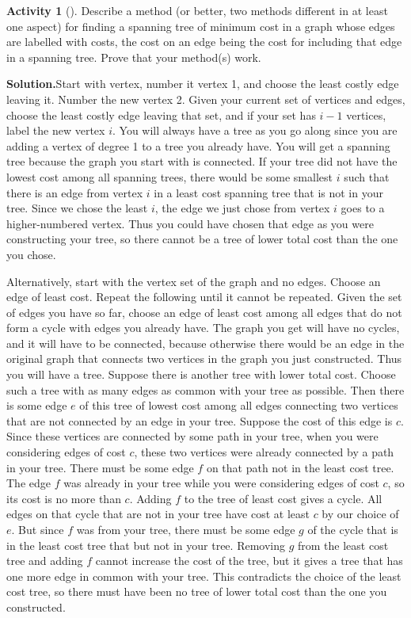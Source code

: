 \documentclass[10pt,]{book}
\theoremstyle{plain}
\theoremstyle{definition}
\newtheorem{activity}[project]{Activity}
\numberwithin{equation}{chapter}
\begin{document}
\begin{activity}[]\label{mincostspantree}
Describe a method (or better, two methods different in at least one aspect) for finding a spanning tree of minimum cost in a graph whose edges are labelled with costs, the cost on an edge being the cost for including that edge in a spanning tree. Prove that your method(s) work.%
\par\medskip\noindent%
\textbf{Solution.}\quad Start with vertex, number it vertex 1, and choose the least costly edge leaving it. Number the new vertex 2. Given your current set of vertices and edges, choose the least costly edge leaving that set, and if your set has \(i-1\) vertices, label the new vertex \(i\). You will always have a tree as you go along since you are adding a vertex of degree 1 to a tree you already have. You will get a spanning tree because the graph you start with is connected. If your tree did not have the lowest cost among all spanning trees, there would be some smallest \(i\) such that there is an edge from vertex \(i\) in a least cost spanning tree that is not in your tree. Since we chose the least \(i\), the edge we just chose from vertex \(i\) goes to a higher-numbered vertex. Thus you could have chosen that edge as you were constructing your tree, so there cannot be a tree of lower total cost than the one you chose.%
\par
Alternatively, start with the vertex set of the graph and no edges. Choose an edge of least cost. Repeat the following until it cannot be repeated. Given the set of edges you have so far, choose an edge of least cost among all edges that do not form a cycle with edges you already have. The graph you get will have no cycles, and it will have to be connected, because otherwise there would be an edge in the original graph that connects two vertices in the graph you just constructed. Thus you will have a tree. Suppose there is another tree with lower total cost. Choose such a tree with as many edges as common with your tree as possible. Then there is some edge \(e\) of this tree of lowest cost among all edges connecting two vertices that are not connected by an edge in your tree. Suppose the cost of this edge is \(c\). Since these vertices are connected by some path in your tree, when you were considering edges of cost \(c\), these two vertices were already connected by a path in your tree. There must be some edge \(f\) on that path not in the least cost tree. The edge \(f\) was already in your tree while you were considering edges of cost \(c\), so its cost is no more than \(c\). Adding \(f\) to the tree of least cost gives a cycle. All edges on that cycle that are not in your tree have cost at least \(c\) by our choice of \(e\). But since \(f\) was from your tree, there must be some edge \(g\) of the cycle that is in the least cost tree that but not in your tree. Removing \(g\) from the least cost tree and adding \(f\) cannot increase the cost of the tree, but it gives a tree that has one more edge in common with your tree. This contradicts the choice of the least cost tree, so there must have been no tree of lower total cost than the one you constructed.%
\end{activity}
\end{document}
